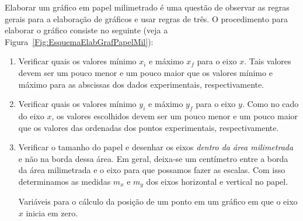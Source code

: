 Elaborar um gráfico em papel milimetrado é uma questão de observar as regras gerais para a elaboração de gráficos e usar regras de três. O procedimento para elaborar o gráfico consiste no seguinte (veja a Figura~\ref{Fig:EsquemaElabGrafPapelMil}):
\begin{enumerate}
	\item Verificar quais os valores mínimo $x_i$ e máximo $x_f$ para o eixo $x$. Tais valores devem ser um pouco menor e um pouco maior que os valores mínimo e máximo para as abscissas dos dados experimentais, respectivamente.
	\item Verificar quais os valores mínimo $y_i$ e máximo $y_f$ para o eixo $y$. Como no cado do eixo $x$, os valores escolhidos devem ser um pouco menor e um pouco maior que os valores das ordenadas dos pontos experimentais, respectivamente.
	\item Verificar o tamanho do papel e desenhar os eixos \emph{dentro da área milimetrada} e não na borda dessa área. Em geral, deixa-se um centímetro entre a borda da área milimetrada e o eixo para que possamos fazer as escalas. Com isso determinamos as medidas $m_x$ e $m_y$ dos eixos horizontal e vertical no papel.
	
\begin{marginfigure}[-4cm]
	\caption{Variáveis para o cálculo da posição de um ponto em um gráfico em que o eixo $x$ inicia em zero.}
	\label{Fig:VarGraphInicioZero}
\end{marginfigure}


\end{enumerate}
